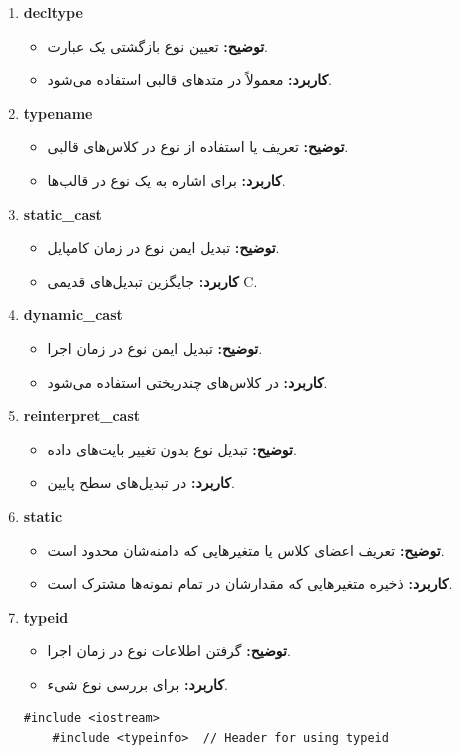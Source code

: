 \documentclass[12pt, a4paper]{report}
\begin{document}
\begin{enumerate}
\begin{lstlisting}[breaklines=true]
	\end{lstlisting}
	\RTL
	\item \textbf{decltype}
	\begin{itemize}
		\item \textbf{توضیح:} تعیین نوع بازگشتی یک عبارت.
		\item \textbf{کاربرد:} معمولاً در متدهای قالبی استفاده می‌شود.
	\end{itemize}
	\item \textbf{typename}
	\begin{itemize}
		\item \textbf{توضیح:} تعریف یا استفاده از نوع در کلاس‌های قالبی.
		\item \textbf{کاربرد:} برای اشاره به یک نوع در قالب‌ها.
	\end{itemize}
	\item \textbf{static\_cast}
	\begin{itemize}
		\item \textbf{توضیح:} تبدیل ایمن نوع در زمان کامپایل.
		\item \textbf{کاربرد:} جایگزین تبدیل‌های قدیمی C.
	\end{itemize}
	\item \textbf{dynamic\_cast}
	\begin{itemize}
		\item \textbf{توضیح:} تبدیل ایمن نوع در زمان اجرا.
		\item \textbf{کاربرد:} در کلاس‌های چندریختی استفاده می‌شود.
	\end{itemize}
	\item \textbf{reinterpret\_cast}
	\begin{itemize}
		\item \textbf{توضیح:} تبدیل نوع بدون تغییر بایت‌های داده.
		\item \textbf{کاربرد:} در تبدیل‌های سطح پایین.
	\end{itemize}
	\item \textbf{static}
	\begin{itemize}
		\item \textbf{توضیح:} تعریف اعضای کلاس یا متغیرهایی که دامنه‌شان محدود است.
		\item \textbf{کاربرد:} ذخیره متغیرهایی که مقدارشان در تمام نمونه‌ها مشترک است.
	\end{itemize}
	\item \textbf{typeid}
	\begin{itemize}
		\item \textbf{توضیح:} گرفتن اطلاعات نوع در زمان اجرا.
		\item \textbf{کاربرد:} برای بررسی نوع شیء.
	\end{itemize}
		\LTR
	\begin{lstlisting}[breaklines=true]
	#include <iostream>
	#include <typeinfo>  // Header for using typeid
	

\end{lstlisting}
\end{enumerate}
\end{document}
